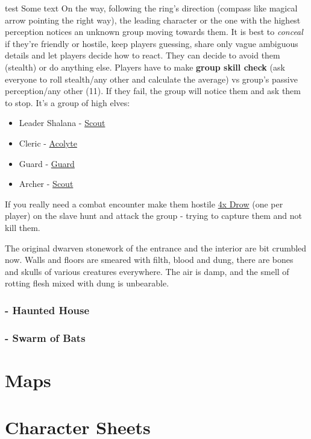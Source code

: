 \documentclass[10pt,onecolumn,twoside,openany,bg=full,layout=true]{dndbook}
\begin{document}
test
Some text
On the way, following the ring's direction (compass like magical arrow pointing the right way), the leading character
or the one with the highest perception notices an unknown group moving towards them.
It is best to \emph{conceal} if they're friendly or hostile, keep players guessing, share only vague ambiguous details and let players decide how to react.
They can decide to avoid them (stealth) or do anything else.
Players have to make \textbf{group skill check} (ask everyone to roll stealth/any other and calculate the average) vs group's passive perception/any other (11).
If they fail, the group will notice them and ask them to stop.
It's a group of high elves:
\begin{itemize}
  \item Leader Shalana - \href{https://www.dndbeyond.com/monsters/17007-scout}{Scout}
  \item Cleric - \href{https://www.dndbeyond.com/monsters/16763-acolyte}{Acolyte}
  \item Guard - \href{https://www.dndbeyond.com/monsters/16915-guard}{Guard}
  \item Archer - \href{https://www.dndbeyond.com/monsters/17007-scout}{Scout}
\end{itemize}

If you really need a combat encounter make them hostile \href{https://www.dndbeyond.com/monsters/17133-drow}{4x Drow}
(one per player) on the slave hunt and attack the group - trying to capture them and not kill them.

The original dwarven stonework of the entrance and the interior are bit crumbled now.
Walls and floors are smeared with filth, blood and dung, there are bones and skulls of various creatures everywhere.
The air is damp, and the smell of rotting flesh mixed with dung is unbearable.

\DndSubArea{}




\subsection{ - Haunted House}\label{subsec:\arabic{subact_num}-haunted-house}
\addtocounter{subact_num}{1}

\subsection{ - Swarm of Bats}\label{subsec:\arabic{subact_num}-swarm-of-bats}
\addtocounter{subact_num}{1}

\vfill
\newpage

\chapter{Maps}\label{ch:maps}

\chapter{Character Sheets}\label{ch:charactersheets}
\end{document}
